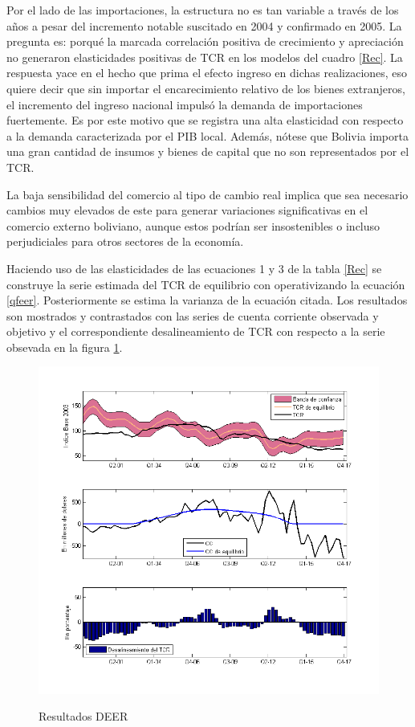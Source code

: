 \documentclass[12pt,letterpaper]{article}
\begin{document}
Por el lado de las importaciones, la estructura no es tan variable a través de los años a pesar del incremento notable suscitado en 2004 y confirmado en 2005. La pregunta es: porqué la marcada correlación positiva de crecimiento y apreciación no generaron elasticidades positivas de TCR en los modelos del cuadro \ref{Rec}. La respuesta yace en el hecho que prima el efecto ingreso en dichas realizaciones, eso quiere decir que sin importar el encarecimiento relativo de los bienes extranjeros, el incremento del ingreso nacional impulsó la demanda de importaciones fuertemente. Es por este motivo que se registra una alta elasticidad con respecto a la demanda caracterizada por el PIB local. Además, nótese que Bolivia importa una gran cantidad de insumos y bienes de capital que no son representados por el TCR. 

La baja sensibilidad del comercio al tipo de cambio real implica que sea necesario cambios muy elevados de este para generar variaciones significativas en el comercio externo boliviano, aunque estos podrían ser insostenibles o incluso perjudiciales para otros sectores de la economía.

Haciendo uso de las elasticidades de las ecuaciones 1 y 3 de la tabla \ref{Rec} se construye la serie estimada del TCR de equilibrio con operativizando la ecuación \ref{qfeer}. Posteriormente se estima la varianza de la ecuación citada. Los resultados son mostrados y contrastados con las series de cuenta corriente observada y objetivo y el correspondiente desalineamiento de TCR con respecto a la serie obsevada en la figura \ref{deerq}.

\begin{figure}
\caption{Resultados DEER}
\centering
\includegraphics[scale=0.7]{tcreq}
\label{deerq}
\end{figure}
\end{document}
